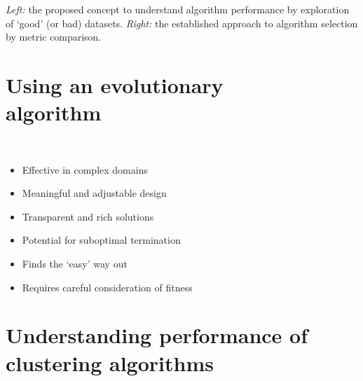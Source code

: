 \documentclass[a0paper]{betterposter}
\begin{document}
{{\fontsize{26}{24}\selectfont\textcolor{mygrey}{%
    \textit{Left:} the proposed concept to understand algorithm performance by
    exploration of `good' (or bad) datasets. \textit{Right:} the established
    approach to algorithm selection by metric comparison.
}}

\vspace{-2.5em}\section{Using an evolutionary\\algorithm}

\vspace{-1em}\begin{minipage}{.04\linewidth}
    \
\end{minipage}
\begin{minipage}{.9\linewidth}
    \begin{itemize}
        \renewcommand\labelitemi{\faThumbsOUp~}
        \item Effective in complex domains
        \item Meaningful and adjustable design
        \item Transparent and rich solutions
    \end{itemize}

    \vspace{1ex}\begin{itemize}
        \renewcommand\labelitemi{\faHandORight~}
        \item Potential for suboptimal termination
        \item Finds the `easy' way out
    \end{itemize}

    \vspace{1ex}\begin{itemize}
        \renewcommand\labelitemi{\faThumbsODown~}
        \item Requires careful consideration of fitness
    \end{itemize}
\end{minipage}

\vspace{-.5em}
\section{Understanding performance of clustering algorithms}

}
\end{document}
